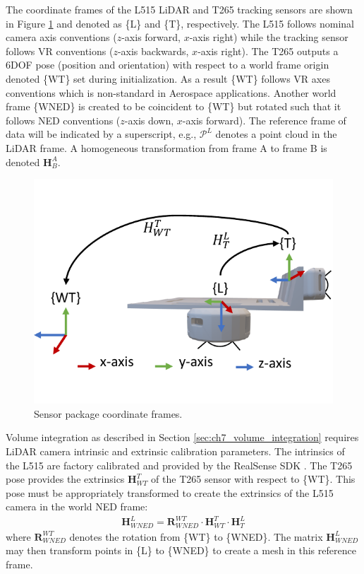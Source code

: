 The coordinate frames of the L515 LiDAR and T265 tracking sensors are shown in Figure \ref{fig:ch7_sensor_frames} and denoted as \{L\} and \{T\}, respectively. The L515 follows nominal camera axis conventions ($z$-axis forward, $x$-axis right) while the tracking sensor follows \acf{VR} conventions ($z$-axis backwards, $x$-axis right). The T265 outputs a 6DOF pose (position and orientation) with respect to a world frame origin denoted \{WT\} set during initialization. As a result \{WT\} follows \ac{VR} axes conventions which is non-standard in Aerospace applications. Another world frame \{WNED\} is created to be coincident to \{WT\} but rotated such that it follows NED conventions ($z$-axis down, $x$-axis forward). The reference frame of data will be indicated by a superscript, e.g., $\mathcal{P}^{L}$ denotes a point cloud in the LiDAR frame. A homogeneous transformation from frame A to frame B is denoted $\mathbf{H}^A_B$.

\begin{figure}[!htb]
  \centering
  \includegraphics[page=1,clip,trim=0cm 1cm 0cm 1cm,width=.45\linewidth]{chapter_7_experiments/imgs/sensor_frames.pdf}
  \caption[Sensor package coordinate frames]{Sensor package coordinate frames.}\label{fig:ch7_sensor_frames}
\end{figure}
Volume integration as described in Section \ref{sec:ch7_volume_integration} requires LiDAR camera intrinsic and extrinsic calibration parameters. The intrinsics of the L515 are factory calibrated and provided by the RealSense SDK \cite{noauthor_github_2020-4}. The T265 pose provides the extrinsics $\mathbf{H}^{T}_{WT}$  of the T265 sensor with respect to \{WT\}. This pose must be appropriately transformed to create the extrinsics of the L515 camera in the world NED frame:
\begin{align*}
   \mathbf{H}^{L}_{WNED}  =  \mathbf{R}^{WT}_{WNED} \cdot \mathbf{H}^{T}_{WT} \cdot \mathbf{H}^{L}_{T}
\end{align*}
where $\mathbf{R}^{WT}_{WNED}$ denotes the rotation from \{WT\} to \{WNED\}. The matrix $\mathbf{H}^{L}_{WNED}$ may then transform points in \{L\} to \{WNED\} to create a mesh in this reference frame.

